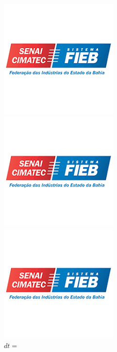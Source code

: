 \begin{figure}[H]
   \centering
   \begin{minipage}{.5\textwidth}
       \centering
       \includegraphics[width=0.5\linewidth, height=0.15\textheight]{images/fig-senai.png}
       \caption{$dt=0.1$}
       \label{fig:prob1_6_2}
   \end{minipage}%
   \begin{minipage}{0.5\textwidth}
       \centering
       \includegraphics[width=0.5\linewidth, height=0.15\textheight]{images/fig-senai.png}
       \caption{$dt =$}
       \label{fig:prob1_6_1}
   \end{minipage}
   \begin{minipage}{0.5\textwidth}
      \centering
      \includegraphics[width=0.5\linewidth, height=0.15\textheight]{images/fig-senai.png}
      \caption{$dt =$}
      \label{fig:prob1_6_1}
   \end{minipage}
   
\end{figure}

